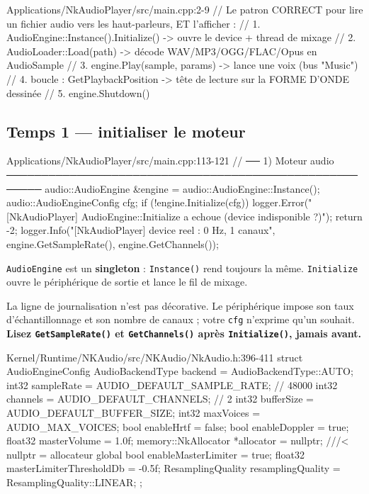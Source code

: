 \begin{nkcode}{Applications/NkAudioPlayer/src/main.cpp:2-9}
// Le patron CORRECT pour lire un fichier audio vers les haut-parleurs, ET l'afficher :
//   1. AudioEngine::Instance().Initialize()  -> ouvre le device + thread de mixage
//   2. AudioLoader::Load(path)               -> décode WAV/MP3/OGG/FLAC/Opus en AudioSample
//   3. engine.Play(sample, params)           -> lance une voix (bus "Music")
//   4. boucle : GetPlaybackPosition -> tête de lecture sur la FORME D'ONDE dessinée
//   5. engine.Shutdown()
\end{nkcode}

\subsection{Temps 1 — initialiser le moteur}

\begin{nkcode}{Applications/NkAudioPlayer/src/main.cpp:113-121}
    // ── 1) Moteur audio ───────────────────────────────────────────────────────
    audio::AudioEngine &engine = audio::AudioEngine::Instance();
    audio::AudioEngineConfig cfg;
    if (!engine.Initialize(cfg)) {
        logger.Error("[NkAudioPlayer] AudioEngine::Initialize a echoue (device indisponible ?)");
        return -2;
    }
    logger.Info("[NkAudioPlayer] device reel : {0} Hz, {1} canaux", engine.GetSampleRate(), engine.GetChannels());
\end{nkcode}

\texttt{AudioEngine} est un \textbf{singleton} : \texttt{Instance()} rend
toujours la même. \texttt{Initialize} ouvre le périphérique de sortie et lance le
fil de mixage.

La ligne de journalisation n'est pas décorative. Le périphérique impose son taux
d'échantillonnage et son nombre de canaux ; votre \texttt{cfg} n'exprime qu'un
souhait. \textbf{Lisez \texttt{GetSampleRate()} et \texttt{GetChannels()} après
\texttt{Initialize()}, jamais avant.}

\begin{nkcode}{Kernel/Runtime/NKAudio/src/NKAudio/NkAudio.h:396-411}
    struct AudioEngineConfig {
            AudioBackendType backend = AudioBackendType::AUTO;
            int32 sampleRate = AUDIO_DEFAULT_SAMPLE_RATE;   // 48000
            int32 channels   = AUDIO_DEFAULT_CHANNELS;      // 2
            int32 bufferSize = AUDIO_DEFAULT_BUFFER_SIZE;
            int32 maxVoices  = AUDIO_MAX_VOICES;
            bool enableHrtf = false;    bool enableDoppler = true;
            float32 masterVolume = 1.0f;
            memory::NkAllocator *allocator = nullptr;       ///< nullptr = allocateur global
            bool enableMasterLimiter = true;
            float32 masterLimiterThresholdDb = -0.5f;
            ResamplingQuality resamplingQuality = ResamplingQuality::LINEAR;
    };
\end{nkcode}

